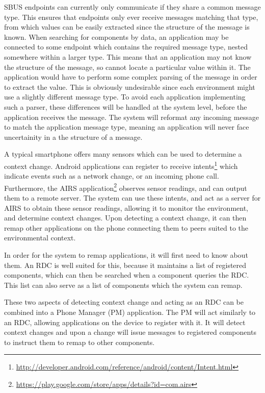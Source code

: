 \documentclass[12pt,twoside,notitlepage]{report}
\begin{document}
SBUS endpoints can currently only communicate if they share a common message type. 
This ensures that endpoints only ever receive messages matching that type, from which values can be easily extracted since the structure of the message is known.
When searching for components by data, an application may be connected to some endpoint which contains the required message type, nested somewhere within a larger type.
This means that an application may not know the structure of the message, so cannot locate a particular value within it. The application would have to perform some complex parsing of the message in order to extract the value. 
This is obviously undesirable since each environment might use a slightly different message type.
To avoid each application implementing such a parser, these differences will be handled at the system level, before the application receives the message. 
The system will reformat any incoming message to match the application message type, meaning an application will never face uncertainity in a the structure of a message. 

A typical smartphone offers many sensors which can be used to determine a context change. 
Android applications can register to receive intents\footnote{\url{http://developer.android.com/reference/android/content/Intent.html}} which indicate events such as a network change, or an incoming phone call. 
Furthermore, the AIRS application\footnote{\url{https://play.google.com/store/apps/details?id=com.airs}} observes sensor readings, and can output them to a remote server.
The system can use these intents, and act as a server for AIRS to obtain these sensor readings, allowing it to monitor the environment, and determine context changes. 
Upon detecting a context change, it can then remap other applications on the phone connecting them to peers suited to the environmental context. 

In order for the system to remap applications, it will first need to know about them. 
An RDC is well suited for this, because it maintains a list of registered components, which can then be searched when a component queries the RDC. 
This list can also serve as a list of components which the system can remap.

These two aspects of detecting context change and acting as an RDC can be combined into a Phone Manager (PM) application. 
The PM will act similarly to an RDC, allowing applications on the device to register with it. 
It will detect context changes and upon a change will issue messages to registered components to instruct them to remap to other components.
\end{document}
